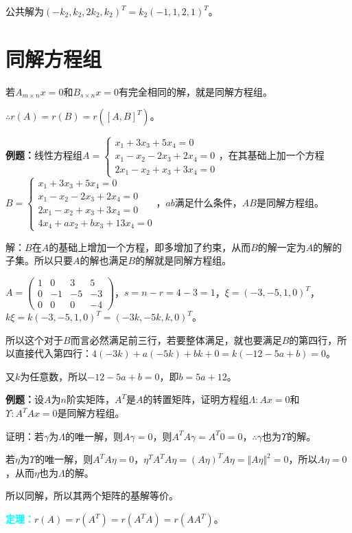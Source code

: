 \documentclass[UTF8, 12pt]{ctexart}
\begin{document}
公共解为$(-k_2,k_2,2k_2,k_2)^T=k_2(-1,1,2,1)^T$。

\section{同解方程组}

若$A_{m\times n}x=0$和$B_{s\times n}x=0$有完全相同的解，就是同解方程组。

$\therefore r(A)=r(B)=r([A,B]^T)$。

\textbf{例题：}线性方程组$A=\left\{\begin{array}{l}
    x_1+3x_3+5x_4=0 \\
    x_1-x_2-2x_3+2x_4=0 \\
    2x_1-x_2+x_3+3x_4=0
\end{array}\right.$，在其基础上加一个方程$B=\left\{\begin{array}{l}
    x_1+3x_3+5x_4=0 \\
    x_1-x_2-2x_3+2x_4=0 \\
    2x_1-x_2+x_3+3x_4=0 \\
    4x_4+ax_2+bx_3+13x_4=0
\end{array}\right.$，$ab$满足什么条件，$AB$是同解方程组。

解：$B$在$A$的基础上增加一个方程，即多增加了约束，从而$B$的解一定为$A$的解的子集。所以只要$A$的解也满足$B$的解就是同解方程组。

$A=\left(\begin{array}{cccc}
    1 & 0 & 3 & 5 \\
    0 & -1 & -5 & -3 \\
    0 & 0 & 0 & -4
\end{array}\right)$，$s=n-r=4-3=1$，$\xi=(-3,-5,1,0)^T$，$k\xi=k(-3,-5,1,0)^T=(-3k,-5k,k,0)^T$。

所以这个对于$B$而言必然满足前三行，若要整体满足，就也要满足$B$的第四行，所以直接代入第四行：$4(-3k)+a(-5k)+bk+0=k(-12-5a+b)=0$。

又$k$为任意数，所以$-12-5a+b=0$，即$b=5a+12$。

\textbf{例题：}设$A$为$n$阶实矩阵，$A^T$是$A$的转置矩阵，证明方程组$\Lambda:Ax=0$和$\Upsilon:A^TAx=0$是同解方程组。

证明：若$\gamma$为$\Lambda$的唯一解，则$A\gamma=0$，则$A^TA\gamma=A^T0=0$，$\therefore\gamma$也为$\Upsilon$的解。

若$\eta$为$\Upsilon$的唯一解，则$A^TA\eta=0$，$\eta^TA^TA\eta=(A\eta)^TA\eta=\Vert A\eta\Vert^2=0$，所以$A\eta=0$，从而$\eta$也为$\Lambda$的解。

所以同解，所以其两个矩阵的基解等价。

\textcolor{aqua}{\textbf{定理：}}$r(A)=r(A^T)=r(A^TA)=r(AA^T)$。
\end{document}
